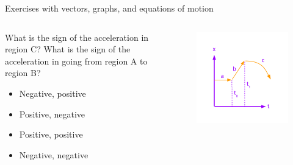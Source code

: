 \documentclass{beamer}
\begin{document}
\begin{frame}{Exercises with vectors, graphs, and equations of motion}
\begin{columns}[T]
\begin{column}{0.4\textwidth}
\small
What is the sign of the acceleration in region C?  What is the sign of the acceleration in going from region A to region B?
\begin{itemize}
\item Negative, positive
\item Positive, negative
\item Positive, positive
\item Negative, negative
\end{itemize}
\end{column}
\begin{column}{0.6\textwidth}
\begin{figure}
\centering
\includegraphics[width=\textwidth,trim=0cm 0cm 0cm 1.5cm,clip=true]{figures/FurtherExercises.pdf}
\end{figure}
\end{column}
\end{columns}
\end{frame}
\end{document}
